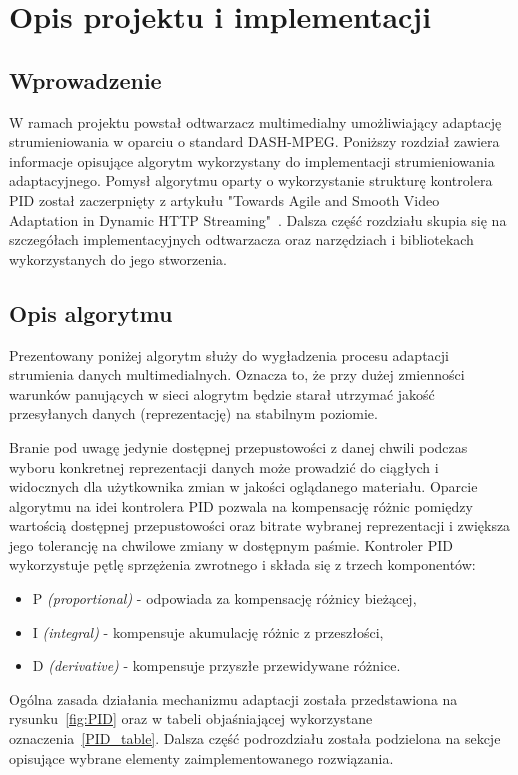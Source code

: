 \chapter{Opis projektu i implementacji}
\label{cha:rozdzial5}

\section{Wprowadzenie}

W ramach projektu powstał odtwarzacz multimedialny umożliwiający adaptację strumieniowania w oparciu o standard DASH-MPEG. Poniższy rozdział zawiera informacje opisujące algorytm wykorzystany do implementacji strumieniowania adaptacyjnego. Pomysł algorytmu oparty o wykorzystanie strukturę kontrolera PID został zaczerpnięty z artykułu "Towards Agile and Smooth Video Adaptation in Dynamic HTTP Streaming"~\cite{Tian}. Dalsza część rozdziału skupia się na szczegółach implementacyjnych odtwarzacza oraz narzędziach i bibliotekach wykorzystanych do jego stworzenia.

\section{Opis algorytmu}
\label{sec:alg}

Prezentowany poniżej algorytm służy do wygładzenia procesu adaptacji strumienia danych multimedialnych. Oznacza to, że przy dużej zmienności warunków panujących w sieci alogrytm będzie starał utrzymać jakość przesyłanych danych (reprezentację) na stabilnym poziomie. 

Branie pod uwagę jedynie dostępnej przepustowości z danej chwili podczas wyboru konkretnej reprezentacji danych może prowadzić do ciągłych i widocznych dla użytkownika zmian w jakości oglądanego materiału. Oparcie algorytmu na idei kontrolera PID pozwala na kompensację różnic pomiędzy wartością dostępnej przepustowości oraz bitrate wybranej reprezentacji i zwiększa jego tolerancję na chwilowe zmiany w dostępnym paśmie. Kontroler PID wykorzystuje pętlę sprzężenia zwrotnego i składa się z trzech komponentów:
\begin{itemize}
\item P \textit{(proportional)} - odpowiada za kompensację różnicy bieżącej,
\item I \textit{(integral)} - kompensuje akumulację różnic z przeszłości,
\item D \textit{(derivative)} - kompensuje przyszłe przewidywane różnice.
\end{itemize}
Ogólna zasada działania mechanizmu adaptacji została przedstawiona na rysunku~\ref{fig:PID} oraz w tabeli objaśniającej wykorzystane oznaczenia~\ref{PID_table}. Dalsza część podrozdziału została podzielona na sekcje opisujące wybrane elementy zaimplementowanego rozwiązania.

